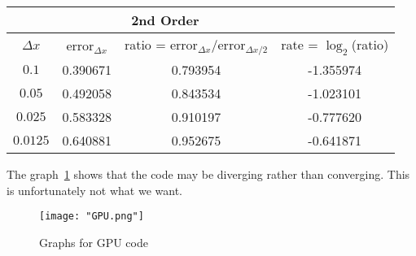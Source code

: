 \documentclass{article}
\begin{document}
\begin{table}[h]
  \begin{center}
    \begin{tabular}{cccc}
      \toprule
      \multicolumn{1}{c}{} &  \multicolumn{2}{c}{2nd Order}  \\
      \midrule
      $\Delta x$&  \hspace{3mm} error$_{\Delta x}$ &\hspace{3mm} ratio = error$_{\Delta x}$/error$_{\Delta x/2}$ \hspace{3mm} &\hspace{3mm} rate = $\log_{2}$(ratio)   \\
      $0.1$    & 0.390671 & 0.793954 & -1.355974 \\
      $0.05 $  & 0.492058 & 0.843534 & -1.023101 \\
      $0.025$  & 0.583328 & 0.910197 & -0.777620 \\
      $0.0125$ & 0.640881 & 0.952675 & -0.641871 \\
      \bottomrule
    \end{tabular}
  \end{center}
\end{table}

The graph~\ref{fig:gpu} shows that the code may be diverging rather than converging. This is
unfortunately not what we want.

\begin{figure}
\texttt{[image: "GPU.png"]}
    \caption{Graphs for GPU code}
    \label{fig:gpu}
\end{figure}
\end{document}
